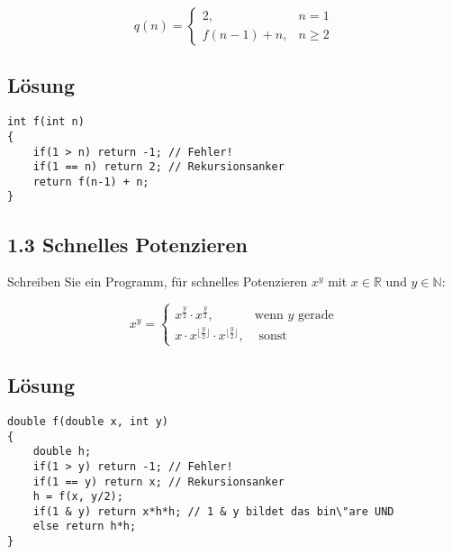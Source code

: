 \documentclass[pdflatex,a4paper,11pt]{scrartcl}
\begin{document}
$$q(n)=\left\{ 
\begin{array}{cl}
2,&n=1\\
f(n-1) + n, &n\ge 2
\end{array}
\right.$$
\subsection*{L\"osung} 
\begin{lstlisting}
int f(int n)
{
    if(1 > n) return -1; // Fehler!
    if(1 == n) return 2; // Rekursionsanker
    return f(n-1) + n;
}
\end{lstlisting}

\subsection*{1.3 Schnelles Potenzieren} 
Schreiben Sie ein Programm, f\"ur schnelles Potenzieren $x^y$ mit $x\in\mathbb{R}$ und $y\in\mathbb{N}$:

$$x^y=\left\{ 
\begin{array}{cl}
x^\frac{y}{2}\cdot x^\frac{y}{2},&\mbox{wenn }y\mbox{ gerade}\\
x\cdot x^{\lfloor\frac{y}{2}\rfloor}\cdot x^{\lfloor\frac{y}{2}\rfloor} , &\mbox{ sonst}
\end{array}
\right.$$
\subsection*{L\"osung} 
\begin{lstlisting}
double f(double x, int y)
{
    double h;
    if(1 > y) return -1; // Fehler!
    if(1 == y) return x; // Rekursionsanker
    h = f(x, y/2);
    if(1 & y) return x*h*h; // 1 & y bildet das bin\"are UND
    else return h*h;
}
\end{lstlisting}
\end{document}
